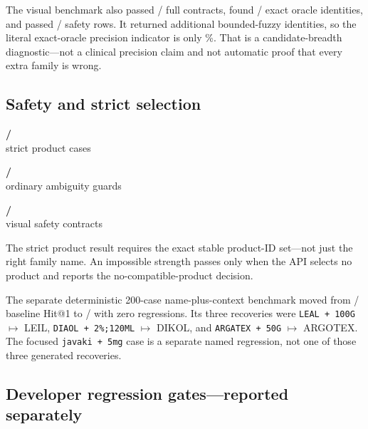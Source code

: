 \documentclass[10pt,a4paper]{article}
\newcommand{\observed}[1]{\texttt{#1}}
\newcommand{\metric}[3]{%
  \begin{minipage}[t]{.29\linewidth}\centering
  {\headingfont\fontsize{21}{23}\selectfont\bfseries\color{#3}#1}\\[-1mm]
  {\small\color{Muted}#2}\end{minipage}}
\begin{document}
The visual benchmark also passed \VisualContractPass/\VisualTotalCases{} full
contracts, found \VisualExactLabelsFound/\VisualExactLabels{} exact oracle
identities, and passed \VisualSafetyPass/\VisualSafetyCases{} safety rows. It
returned \VisualExtraIdentities{} additional bounded-fuzzy identities, so the
literal exact-oracle precision indicator is only \VisualPrecisionIndicator\%.
That is a candidate-breadth diagnostic---not a clinical precision claim and
not automatic proof that every extra family is wrong.

\subsection{Safety and strict selection}

\begin{center}
\metric{\ProductPass/\ProductCases}{strict product cases}{Green}\hfill
\metric{\OrdinarySafetyPass/\OrdinarySafetyCases}{ordinary ambiguity guards}{Amber}\hfill
\metric{\VisualSafetyPass/\VisualSafetyCases}{visual safety contracts}{Cyan}
\end{center}

The strict product result requires the exact stable product-ID set---not just
the right family name. An impossible strength passes only when the API selects
no product and reports the no-compatible-product decision.

The separate deterministic 200-case name-plus-context benchmark moved from
\ProductContextBaseline/\ProductContextCases{} baseline Hit@1 to
\ProductContextHitOne/\ProductContextCases{} with zero regressions. Its three
recoveries were \observed{LEAL + 100G} $\mapsto$ LEIL,
\observed{DIAOL + 2\%;120ML} $\mapsto$ DIKOL, and
\observed{ARGATEX + 50G} $\mapsto$ ARGOTEX. The focused
\observed{javaki + 5mg} case is a separate named regression, not one of those
three generated recoveries.

\subsection{Developer regression gates---reported separately}
\end{document}
